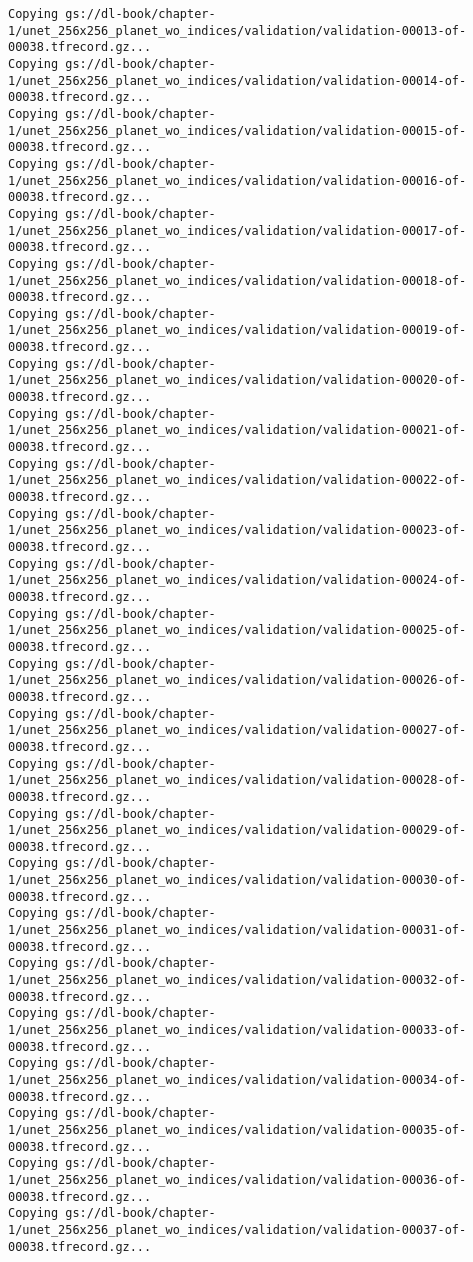 \documentclass[
  letterpaper,
  DIV=11,
  numbers=noendperiod]{scrreprt}
\begin{document}
\begin{verbatim}
Copying gs://dl-book/chapter-1/unet_256x256_planet_wo_indices/validation/validation-00013-of-00038.tfrecord.gz...
Copying gs://dl-book/chapter-1/unet_256x256_planet_wo_indices/validation/validation-00014-of-00038.tfrecord.gz...
Copying gs://dl-book/chapter-1/unet_256x256_planet_wo_indices/validation/validation-00015-of-00038.tfrecord.gz...
Copying gs://dl-book/chapter-1/unet_256x256_planet_wo_indices/validation/validation-00016-of-00038.tfrecord.gz...
Copying gs://dl-book/chapter-1/unet_256x256_planet_wo_indices/validation/validation-00017-of-00038.tfrecord.gz...
Copying gs://dl-book/chapter-1/unet_256x256_planet_wo_indices/validation/validation-00018-of-00038.tfrecord.gz...
Copying gs://dl-book/chapter-1/unet_256x256_planet_wo_indices/validation/validation-00019-of-00038.tfrecord.gz...
Copying gs://dl-book/chapter-1/unet_256x256_planet_wo_indices/validation/validation-00020-of-00038.tfrecord.gz...
Copying gs://dl-book/chapter-1/unet_256x256_planet_wo_indices/validation/validation-00021-of-00038.tfrecord.gz...
Copying gs://dl-book/chapter-1/unet_256x256_planet_wo_indices/validation/validation-00022-of-00038.tfrecord.gz...
Copying gs://dl-book/chapter-1/unet_256x256_planet_wo_indices/validation/validation-00023-of-00038.tfrecord.gz...
Copying gs://dl-book/chapter-1/unet_256x256_planet_wo_indices/validation/validation-00024-of-00038.tfrecord.gz...
Copying gs://dl-book/chapter-1/unet_256x256_planet_wo_indices/validation/validation-00025-of-00038.tfrecord.gz...
Copying gs://dl-book/chapter-1/unet_256x256_planet_wo_indices/validation/validation-00026-of-00038.tfrecord.gz...
Copying gs://dl-book/chapter-1/unet_256x256_planet_wo_indices/validation/validation-00027-of-00038.tfrecord.gz...
Copying gs://dl-book/chapter-1/unet_256x256_planet_wo_indices/validation/validation-00028-of-00038.tfrecord.gz...
Copying gs://dl-book/chapter-1/unet_256x256_planet_wo_indices/validation/validation-00029-of-00038.tfrecord.gz...
Copying gs://dl-book/chapter-1/unet_256x256_planet_wo_indices/validation/validation-00030-of-00038.tfrecord.gz...
Copying gs://dl-book/chapter-1/unet_256x256_planet_wo_indices/validation/validation-00031-of-00038.tfrecord.gz...
Copying gs://dl-book/chapter-1/unet_256x256_planet_wo_indices/validation/validation-00032-of-00038.tfrecord.gz...
Copying gs://dl-book/chapter-1/unet_256x256_planet_wo_indices/validation/validation-00033-of-00038.tfrecord.gz...
Copying gs://dl-book/chapter-1/unet_256x256_planet_wo_indices/validation/validation-00034-of-00038.tfrecord.gz...
Copying gs://dl-book/chapter-1/unet_256x256_planet_wo_indices/validation/validation-00035-of-00038.tfrecord.gz...
Copying gs://dl-book/chapter-1/unet_256x256_planet_wo_indices/validation/validation-00036-of-00038.tfrecord.gz...
Copying gs://dl-book/chapter-1/unet_256x256_planet_wo_indices/validation/validation-00037-of-00038.tfrecord.gz...
\end{verbatim}
\end{document}
